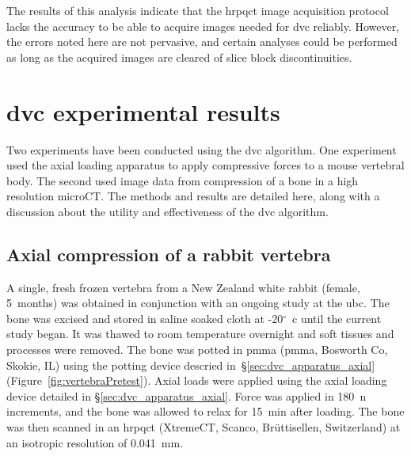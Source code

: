 The results of this analysis indicate that the \ac{hrpqct} image acquisition protocol lacks the accuracy to be able to acquire images needed for \ac{dvc} reliably.
However, the errors noted here are not pervasive, and certain analyses could be performed as long as the acquired images are cleared of slice block discontinuities.

\section{\acs*{dvc} experimental results}
\label{sec:dvc_results_exp}
Two experiments have been conducted using the \ac{dvc} algorithm.
One experiment used the axial loading apparatus to apply compressive forces to a mouse vertebral body.
The second used image data from compression of a bone in a high resolution microCT.
The methods and results are detailed here, along with a discussion about the utility and effectiveness of the \ac{dvc} algorithm.

\subsection{Axial compression of a rabbit vertebra}
\label{sec:dvc_results_rabbit}
A single, fresh frozen vertebra from a New Zealand white rabbit (female, 5~months) was obtained in conjunction with an ongoing study at the \ac{ubc}.
The bone was excised and stored in saline soaked cloth at -20$^\circ$~\ac{c} until the current study began.
It was thawed to room temperature overnight and soft tissues and processes were removed.
The bone was potted in \ac{pmma} (\acs{pmma}, Bosworth Co, Skokie, IL) using the potting device descried in~\S\ref{sec:dvc_apparatus_axial} (Figure~\ref{fig:vertebraPretest}).
Axial loads were applied using the axial loading device detailed in \S\ref{sec:dvc_apparatus_axial}.
Force was applied in 180~\ac{n} increments, and the bone was allowed to relax for 15~\acs{min} after loading.
The bone was then scanned in an \ac{hrpqct} (XtremeCT, Scanco, Br\"{u}ttisellen, Switzerland) at an isotropic resolution of 0.041~\ac{mm}.

